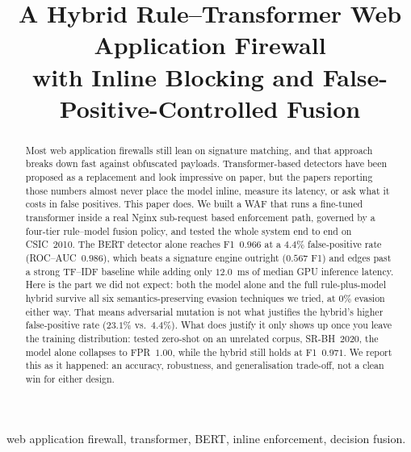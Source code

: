 \documentclass[conference]{IEEEtran}
\begin{document}
\title{A Hybrid Rule--Transformer Web Application Firewall\\
with Inline Blocking and False-Positive-Controlled Fusion}

\author{
}

\maketitle

\begin{abstract}
Most web application firewalls still lean on signature matching, and that
approach breaks down fast against obfuscated payloads. Transformer-based
detectors have been proposed as a replacement and look impressive on paper,
but the papers reporting those numbers almost never place the model inline,
measure its latency, or ask what it costs in false positives. This paper
does. We built a WAF that runs a fine-tuned transformer inside a real
Nginx sub-request based enforcement path, governed by a four-tier
rule--model fusion policy, and tested the whole system end to end on
CSIC~2010. The BERT detector alone reaches F1~$0.966$ at a $4.4\%$
false-positive rate (ROC--AUC~$0.986$), which beats a signature engine
outright ($0.567$ F1) and edges past a strong TF--IDF baseline while adding
only $12.0$~ms of median GPU inference latency. Here is the part we did not
expect: both the model alone and the full rule-plus-model hybrid survive all
six semantics-preserving evasion techniques we tried, at $0\%$ evasion
either way. That means adversarial mutation is not what justifies the hybrid's
higher false-positive rate ($23.1\%$ vs.\ $4.4\%$). What does justify it
only shows up once you leave the training distribution: tested zero-shot on
an unrelated corpus, SR-BH~2020, the model alone collapses to FPR~$1.00$,
while the hybrid still holds at F1~$0.971$. We report this as it
happened: an accuracy, robustness, and generalisation trade-off, not a
clean win for either design.
\end{abstract}

\begin{IEEEkeywords}
web application firewall, transformer, BERT, inline enforcement, decision fusion.
\end{IEEEkeywords}
\end{document}

